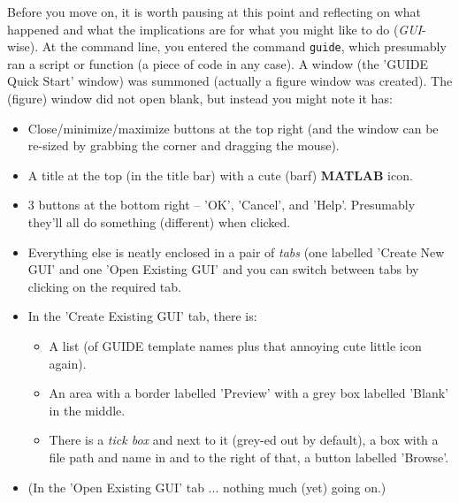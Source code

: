 \documentclass{tufte-book} %
\begin{document}
Before you move on, it is worth pausing at this point and reflecting on what happened and what the implications are for what you might like to do (\textit{GUI}-wise). At the command line, you entered the command \texttt{guide}, which presumably ran a script or function (a piece of code in any case). A window (the '\textsf{GUIDE Quick Start}' window) was summoned (actually a \textsf{figure window} was created). The (figure) window did not open  blank, but instead you might note it has:
\vspace{-2mm}
\begin{itemize}[noitemsep]
\setlength{\itemindent}{.2in}
\vspace{1mm}
\item Close/minimize/maximize buttons at the top right (and the window can be re-sized by grabbing the corner and dragging the mouse).
\vspace{1mm}
\item A title at the top (in the title bar) with a cute (barf) \textbf{MATLAB} icon.
\vspace{1mm}
\item  3 buttons at the bottom right -- '\textsf{OK}', '\textsf{Cancel}', and '\textsf{Help}'. Presumably they'll all do something (different) when clicked.
\vspace{1mm}
\item Everything else is neatly enclosed in a pair of \textit{tabs} (one labelled '\textsf{Create New GUI}' and one '\textsf{Open Existing GUI}' and you can switch between tabs by clicking on the required tab.
\vspace{1mm}
\item In the '\textsf{Create Existing GUI}' tab, there is:
\begin{itemize}[noitemsep]
\setlength{\itemindent}{.2in}
\item A list (of \textsf{GUIDE template} names plus that annoying cute little icon again).
\item An area with a border labelled '\textsf{Preview}' with a grey box labelled '\textsf{Blank}' in the middle.
\item There is a \textit{tick box} and next to it (grey-ed out by default), a box with a file path and name in and to the right of that, a button labelled '\textsf{Browse}'.
\end{itemize}
\vspace{1mm}
\item (In the '\textsf{Open Existing GUI}' tab ... nothing much (yet) going on.)
\end{itemize} 
\end{document}
